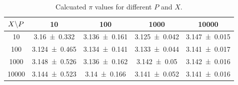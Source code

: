 \begin{table}
\centering
\caption{
    Calcuated $\pi$ values for different $P$ and $X$.
    }
\label{tab:ex1.5_pi_values}
\begin{tabular}{c|cccc}
\toprule
$X \text\textbackslash P$ & 10 & 100 & 1000 & 10000 \\
\midrule
10 & \num{3.16 \pm 0.332} & \num{3.136 \pm 0.161} & \num{3.125 \pm 0.042} & \num{3.147 \pm 0.015} \\
100 & \num{3.124 \pm 0.465} & \num{3.134 \pm 0.141} & \num{3.133 \pm 0.044} & \num{3.141 \pm 0.017} \\
1000 & \num{3.148 \pm 0.526} & \num{3.136 \pm 0.162} & \num{3.142 \pm 0.05} & \num{3.142 \pm 0.016} \\
10000 & \num{3.144 \pm 0.523} & \num{3.14 \pm 0.166} & \num{3.141 \pm 0.052} & \num{3.141 \pm 0.016} \\
\bottomrule
\end{tabular}
\end{table}
